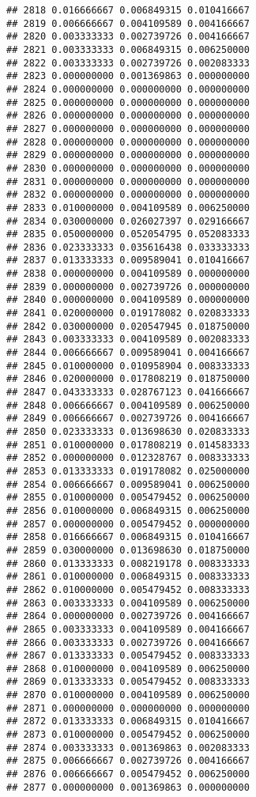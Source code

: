 \documentclass[
]{article}
\begin{document}
\begin{verbatim}
## 2818 0.016666667 0.006849315 0.010416667
## 2819 0.006666667 0.004109589 0.004166667
## 2820 0.003333333 0.002739726 0.004166667
## 2821 0.003333333 0.006849315 0.006250000
## 2822 0.003333333 0.002739726 0.002083333
## 2823 0.000000000 0.001369863 0.000000000
## 2824 0.000000000 0.000000000 0.000000000
## 2825 0.000000000 0.000000000 0.000000000
## 2826 0.000000000 0.000000000 0.000000000
## 2827 0.000000000 0.000000000 0.000000000
## 2828 0.000000000 0.000000000 0.000000000
## 2829 0.000000000 0.000000000 0.000000000
## 2830 0.000000000 0.000000000 0.000000000
## 2831 0.000000000 0.000000000 0.000000000
## 2832 0.000000000 0.000000000 0.000000000
## 2833 0.010000000 0.004109589 0.006250000
## 2834 0.030000000 0.026027397 0.029166667
## 2835 0.050000000 0.052054795 0.052083333
## 2836 0.023333333 0.035616438 0.033333333
## 2837 0.013333333 0.009589041 0.010416667
## 2838 0.000000000 0.004109589 0.000000000
## 2839 0.000000000 0.002739726 0.000000000
## 2840 0.000000000 0.004109589 0.000000000
## 2841 0.020000000 0.019178082 0.020833333
## 2842 0.030000000 0.020547945 0.018750000
## 2843 0.003333333 0.004109589 0.002083333
## 2844 0.006666667 0.009589041 0.004166667
## 2845 0.010000000 0.010958904 0.008333333
## 2846 0.020000000 0.017808219 0.018750000
## 2847 0.043333333 0.028767123 0.041666667
## 2848 0.006666667 0.004109589 0.006250000
## 2849 0.006666667 0.002739726 0.004166667
## 2850 0.023333333 0.013698630 0.020833333
## 2851 0.010000000 0.017808219 0.014583333
## 2852 0.000000000 0.012328767 0.008333333
## 2853 0.013333333 0.019178082 0.025000000
## 2854 0.006666667 0.009589041 0.006250000
## 2855 0.010000000 0.005479452 0.006250000
## 2856 0.010000000 0.006849315 0.006250000
## 2857 0.000000000 0.005479452 0.000000000
## 2858 0.016666667 0.006849315 0.010416667
## 2859 0.030000000 0.013698630 0.018750000
## 2860 0.013333333 0.008219178 0.008333333
## 2861 0.010000000 0.006849315 0.008333333
## 2862 0.010000000 0.005479452 0.008333333
## 2863 0.003333333 0.004109589 0.006250000
## 2864 0.000000000 0.002739726 0.004166667
## 2865 0.003333333 0.004109589 0.004166667
## 2866 0.003333333 0.002739726 0.004166667
## 2867 0.013333333 0.005479452 0.008333333
## 2868 0.010000000 0.004109589 0.006250000
## 2869 0.013333333 0.005479452 0.008333333
## 2870 0.010000000 0.004109589 0.006250000
## 2871 0.000000000 0.000000000 0.000000000
## 2872 0.013333333 0.006849315 0.010416667
## 2873 0.010000000 0.005479452 0.006250000
## 2874 0.003333333 0.001369863 0.002083333
## 2875 0.006666667 0.002739726 0.004166667
## 2876 0.006666667 0.005479452 0.006250000
## 2877 0.000000000 0.001369863 0.000000000

\end{verbatim}
\end{document}
